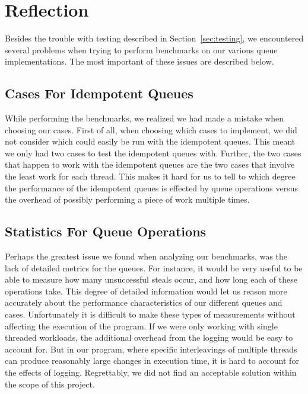 \section{Reflection}
\label{sec:Reflection}
Besides the trouble with testing described in Section~\ref{sec:testing}, we
encountered several problems when trying to perform benchmarks on our various
queue implementations. The most important of these issues are described below.
 
\subsection{Cases For Idempotent Queues}
\label{sub:cases_for_idempotent_queues}
While performing the benchmarks, we realized we had made a mistake when
choosing our cases. First of all, when choosing which cases to implement, we
did not consider which could easily be run with the idempotent queues. This
meant we only had two cases to test the idempotent queues with. Further, the
two cases that happen to work with the idempotent queues are the two cases
that involve the least work for each thread. This makes it hard for us to tell
to which degree the performance of the idempotent queues is effected by queue
operations versus the overhead of possibly performing a piece of work multiple
times.

\subsection{Statistics For Queue Operations}
\label{sub:statistic_for_queue_operations}
Perhaps the greatest issue we found when analyzing our benchmarks, was the lack
of detailed metrics for the queues. For instance, it would be very useful to be
able to measure how many unsuccessful steals occur, and how long each of these
operations take. This degree of detailed information would let us reason more
accurately about the performance characteristics of our different queues and
cases. Unfortunately it is difficult to make these types of measurements
without affecting the execution of the program. If we were only working with
single threaded workloads, the additional overhead from the logging would be
easy to account for. But in our program, where specific interleavings of
multiple threads can produce reasonably large changes in execution time, it is
hard to account for the effects of logging. Regrettably, we did not find an
acceptable solution within the scope of this project.

